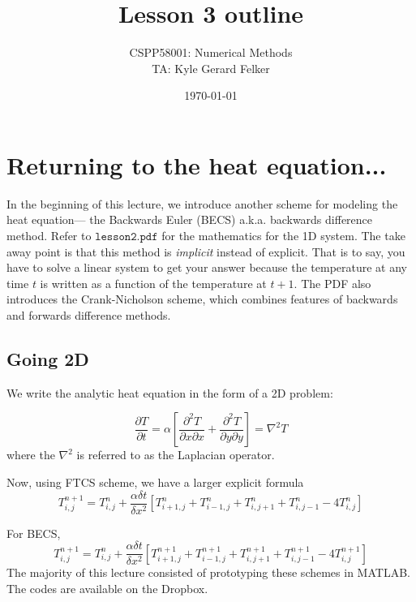 \documentclass[11pt]{article}
\begin{document}
\title{Lesson 3 outline} 
\author{CSPP58001: Numerical Methods \\ TA: Kyle Gerard Felker}
\date{\today}
\maketitle

\section{Returning to the heat equation...}
In the beginning of this lecture, we introduce another scheme for modeling the heat equation--- the Backwards Euler (BECS) a.k.a. backwards difference method. Refer to $\texttt{lesson2.pdf}$ for the mathematics for the 1D system. The take away point is that this method is \emph{implicit} instead of explicit. That is to say, you have to solve a linear system to get your answer because the temperature at any time $t$ is written as a function of the temperature at $t+1$. The PDF also introduces the Crank-Nicholson scheme, which combines features of backwards and forwards difference methods. 

\subsection{Going 2D}
We write the analytic heat equation in the form of a 2D problem:

$$ \frac{\partial T}{\partial t} = \alpha [ \frac{\partial^2 T}{\partial x\partial x} + \frac{\partial^2 T}{\partial y\partial y} ] = \nabla^2T$$
where the $\nabla^2$ is referred to as the Laplacian operator.

Now, using FTCS scheme, we have a larger explicit formula
$$ T_{i,j}^{n+1} = T_{i,j}^n + \frac{\alpha \delta t}{\delta x^2} [ T_{i+1,j}^n +  T_{i-1,j}^n +  T_{i,j+1}^n  +  T_{i,j-1}^n - 4 T_{i,j}^n ] $$  

For BECS,
$$ T_{i,j}^{n+1} = T_{i,j}^n + \frac{\alpha \delta t}{\delta x^2} [ T_{i+1,j}^{n+1} +  T_{i-1,j}^{n+1} +  T_{i,j+1}^{n+1}  +  T_{i,j-1}^{n+1} - 4 T_{i,j}^{n+1} ] $$
The majority of this lecture consisted of prototyping these schemes in MATLAB. The codes are available on the Dropbox.
\end{document}
